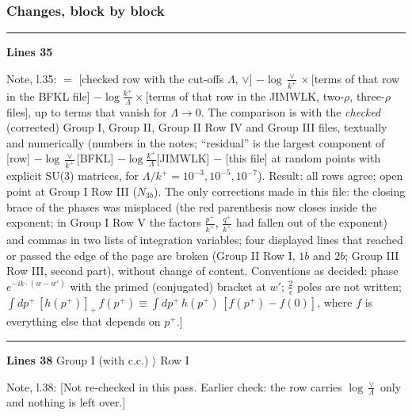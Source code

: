 \documentclass[10pt]{article}
\newenvironment{notebox}{\def\FrameCommand{{\color{notebar}\vrule width 1.5pt}\hspace{6pt}}\MakeFramed{\advance\hsize-\width\FrameRestore}\small}{\endMakeFramed}
\begin{document}
\subsubsection*{Changes, block by block}
\noindent\rule{\linewidth}{0.3pt}\par\noindent\textbf{Lines 35}\par
\begin{notebox}\textsf{\small Note, l.35:} \noindent[\textbf{Checked copy.} Marking: red $=$ corrected or added, part of the expression; red text in square brackets $=$ notes; orange, struck out $=$ removed. Checked, row by row: [this file] $=$ [checked row with the cut-offs $\Lambda$, $\vee$] $-\log\frac{\vee}{k^{+}}\times$[terms of that row in the BFKL file] $-\log\frac{k^{+}}{\Lambda}\times$[terms of that row in the JIMWLK, two-$\rho$, three-$\rho$ files], up to terms that vanish for $\Lambda\to0$. The comparison is with the \emph{checked} (corrected) Group I, Group II, Group II Row IV and Group III files, textually and numerically (numbers in the notes; ``residual'' is the largest component of [row] $-\log\frac{\vee}{k^{+}}$[BFKL] $-\log\frac{k^{+}}{\Lambda}$[JIMWLK] $-$ [this file] at random points with explicit SU(3) matrices, for $\Lambda/k^{+}=10^{-3},10^{-5},10^{-7}$). Result: all rows agree; open point at Group I Row III ($N_{3b}$). The only corrections made in this file: the closing brace of the phases was misplaced (the red parenthesis now closes inside the exponent; in Group I Row V the factors $\frac{p^{+}}{k^{+}}$, $\frac{q^{+}}{k^{+}}$ had fallen out of the exponent) and commas in two lists of integration variables; four displayed lines that reached or passed the edge of the page are broken (Group II Row I, $1b$ and $2b$; Group III Row III, second part), without change of content. Conventions as decided: phase $e^{-ik\cdot(w-w')}$ with the primed (conjugated) bracket at $w'$; $\frac{2}{\epsilon}$ poles are not written; $\int dp^{+}\,[h(p^{+})]_{+}\,f(p^{+})\equiv\int dp^{+}\,h(p^{+})\,[f(p^{+})-f(0)]$, where $f$ is everything else that depends on $p^{+}$.]\end{notebox}
\noindent\rule{\linewidth}{0.3pt}\par\noindent\textbf{Lines 38} \quad \textsf{Group I (with c.c.) $\rangle$ Row I}\par
\begin{notebox}\textsf{\small Note, l.38:} [Not re-checked in this pass. Earlier check: the row carries $\log\frac{\vee}{\Lambda}$ only and nothing is left over.]\end{notebox}
\end{document}
